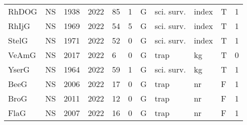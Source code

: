 \begin{table}[ht]
\begin{tabular}{p{1cm}p{1cm}p{1cm}p{1cm}p{0.8cm}p{0.8cm}p{1cm}p{2cm}p{2cm}p{1cm}p{1cm}}
  RhDOG & NS & 1938 & 2022 & 85 & 1 & G & sci. surv. & index & T & 1 \\ 
  RhIjG & NS & 1969 & 2022 & 54 & 5 & G & sci. surv. & index & T & 1 \\ 
  StelG & NS & 1971 & 2022 & 52 & 0 & G & sci. surv. & index & T & 1 \\ 
  VeAmG & NS & 2017 & 2022 & 6 & 0 & G & trap & kg & T & 0 \\ 
  YserG & NS & 1964 & 2022 & 59 & 1 & G & sci. surv. & kg & T & 1 \\ 
  BeeG & NS & 2006 & 2022 & 17 & 0 & G & trap & nr & F & 1 \\ 
  BroG & NS & 2011 & 2022 & 12 & 0 & G & trap & nr & F & 1 \\ 
  FlaG & NS & 2007 & 2022 & 16 & 0 & G & trap & nr & F & 1 \\ 
   \hline
\end{tabular}
\end{table}
